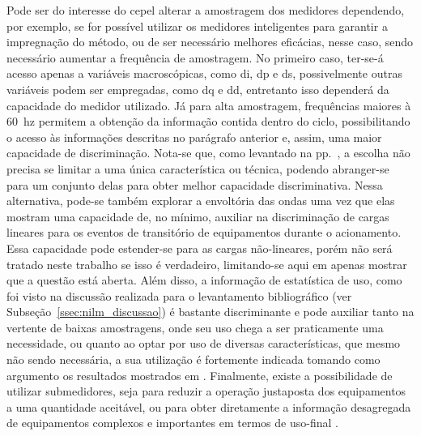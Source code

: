 Pode ser do interesse do \acs{cepel} alterar a amostragem dos
medidores dependendo, por exemplo, se for possível utilizar os
medidores inteligentes para garantir a impregnação do método, ou de
ser necessário melhores eficácias, nesse caso, sendo necessário
aumentar a frequência de amostragem. No primeiro caso,
ter-se-á acesso apenas a variáveis macroscópicas, como \acs{di}, \acs{dp}
e \acs{ds}, possivelmente outras variáveis podem ser empregadas, como
\acs{dq} e \acs{dd}, entretanto isso dependerá da capacidade do
medidor utilizado. Já para alta amostragem,
frequências maiores à 60~\acs{hz} permitem a obtenção da informação
contida dentro do ciclo, possibilitando o acesso às informações
descritas no parágrafo anterior e, assim, uma maior capacidade de
discriminação. Nota-se que, como levantado na
pp.~\pageref{nilm:multiplas_tecnicas}, a escolha não precisa se limitar
a uma única característica ou técnica, podendo abranger-se para um
conjunto delas para obter melhor capacidade discriminativa. Nessa
alternativa, pode-se também explorar a envoltória das ondas uma vez que
elas mostram uma capacidade de, no mínimo, auxiliar na discriminação
de cargas lineares para os eventos de transitório de equipamentos durante
o acionamento. Essa capacidade pode estender-se para as
cargas não-lineares, porém não será tratado neste trabalho se isso
é verdadeiro, limitando-se aqui em apenas mostrar que a questão
está aberta. Além disso, a informação de estatística de uso, como foi
visto na discussão realizada para o levantamento bibliográfico (ver
Subseção~\ref{ssec:nilm_discussao}) é bastante discriminante e pode
auxiliar tanto na vertente de baixas amostragens, onde seu uso chega a
ser praticamente uma necessidade, ou quanto ao optar por uso de
diversas características, que mesmo não sendo necessária, a sua
utilização é fortemente indicada tomando como argumento os resultados
mostrados em
\cite{nilm_zeifman_vast_2011,nilm_zeifman_vastext_approach_2012,
nilm_zeifman_statistical_vastext_1stws_2012,
nilm_zeifman_vast_hisample_pdfmerge_2011,
nilm_zeifman_statistical_naive_enduses_2013}. Finalmente, existe a
possibilidade de utilizar submedidores, seja para reduzir a operação
justaposta dos equipamentos a uma quantidade aceitável, ou para obter
diretamente a informação desagregada de equipamentos complexos e
importantes em termos de uso-final
\cite{seminilm_ihome_tomek_2012,seminilm_fhmm_empiricalnmeter_2013,
seminilm_berges_multisensor_2010}.



